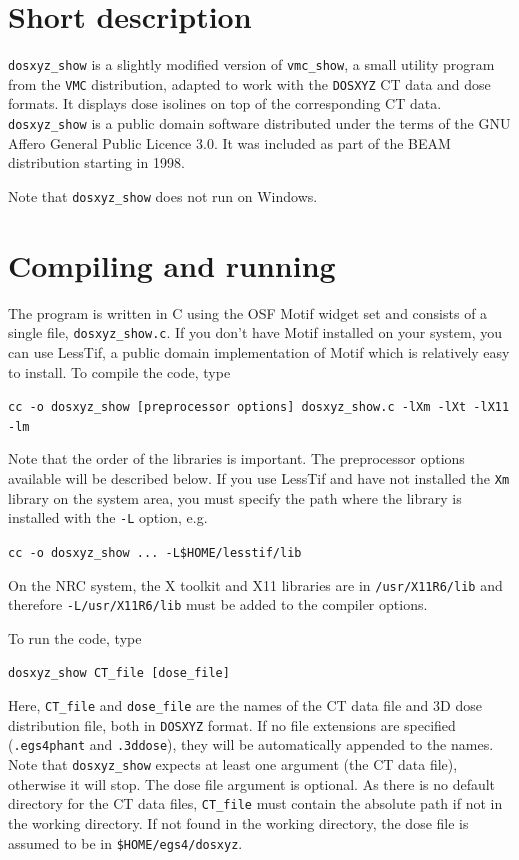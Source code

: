\documentclass[12pt]{article}
\begin{document}
\newpage

\pagestyle{fancy}
\setcounter{page}{2}

\section{\sffamily Short description}


{\tt dosxyz\_show} is a slightly modified version of
{\tt vmc\_show}, a small utility program from the
{\tt VMC} distribution,
adapted to work with the {\tt DOSXYZ}
CT data and dose formats. It displays dose
isolines on top of the corresponding CT data.
{\tt dosxyz\_show} is a public domain software distributed under the
terms of the GNU Affero General Public Licence 3.0. It was included as part
of the BEAM distribution starting in 1998.

\noindent
Note that {\tt dosxyz\_show} does not run on Windows.


\section{\sffamily Compiling and running}

The program is written in C using the OSF Motif widget
set and consists of a single file, {\tt dosxyz\_show.c}.
If you don't have Motif installed on your system, you
can use LessTif, a public domain implementation of
Motif which is relatively easy to install. To compile the
code, type
\begin{flushleft}
{\tt cc -o dosxyz\_show [preprocessor options] dosxyz\_show.c -lXm -lXt -lX11
-lm}
\end{flushleft}
Note that the order of the libraries is important.
The preprocessor options available will be described below.
If you use LessTif and have not installed the {\tt Xm} library on
the system area, you must specify the path where the library is
installed with the {\tt -L} option, {e.g.}
\begin{flushleft}
{\tt cc -o dosxyz\_show ... -L\$HOME/lesstif/lib}
\end{flushleft}
On the NRC system, the X toolkit and X11 libraries are
in {\tt /usr/X11R6/lib} and therefore {\tt -L/usr/X11R6/lib} must
be added to the compiler options.

\noindent
To run the code, type
\begin{flushleft}
{\tt dosxyz\_show CT\_file [dose\_file]}
\end{flushleft}
Here, {\tt CT\_file} and {\tt dose\_file} are the names of
the CT data file and 3D dose distribution file, both in
{\tt DOSXYZ} format. If no file extensions are specified
({\tt .egs4phant} and {\tt .3ddose}), they will be automatically
appended to the names.
Note that {\tt dosxyz\_show} expects at least one argument
(the CT data file), otherwise it will stop. The dose file
argument is optional. As there is no default directory
for the CT data files, {\tt CT\_file} must
contain the absolute path if not in the working directory.
If not found in the working directory, the dose file is assumed to
be in {\tt \$HOME/egs4/dosxyz}.
\end{document}
